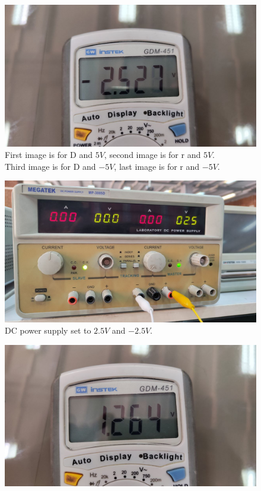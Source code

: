 \documentclass[11pt]{article}
\newcommand{\PicScale}{0.2}
\begin{document}
\begin{question}
\begin{subquestion}
{\begin{figure}[H]
                \includegraphics[scale=0.08,angle=0]{Fig/18.jpeg}
                \caption{First image is for D and $5V$, second image is for r and $5V$. \\
                    \hspace*{14mm} Third image is for D and $-5V$, last image is for r and $-5V$.}
            \end{figure}
            \begin{figure}[H]
                \centering
                \includegraphics[scale=\PicScale,angle=0]{Fig/19.jpeg}
                \caption{DC power supply set to $2.5V$ and $-2.5V$.}
            \end{figure}
            \begin{figure}[H]
                \centering
                \includegraphics[scale=0.08,angle=0]{Fig/20.jpeg}

\end{figure}}
\end{subquestion}
\end{question}
\end{document}
